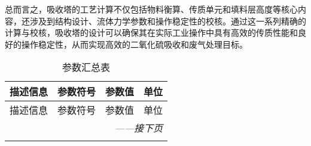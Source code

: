 总而言之，吸收塔的工艺计算不仅包括物料衡算、传质单元和填料层高度等核心内容，还涉及到结构设计、流体力学参数和操作稳定性的校核。通过这一系列精确的计算与校核，吸收塔的设计可以确保其在实际工业操作中具有高效的传质性能和良好的操作稳定性，从而实现高效的二氧化硫吸收和废气处理目标。

\clearpage

\begin{longtable}{
		@{} p{} p{} 
		p{} p{} @{}
		}
	\caption{参数汇总表} \\
	\toprule
	描述信息 & 参数符号 & 参数值 & 单位 \\
	\midrule
	\endfirsthead
	
	\toprule
	描述信息 & 参数符号 & 参数值 & 单位 \\
	\midrule
	\endhead
	
	\midrule
	\multicolumn{4}{r}{\textit{——接下页}} \\
	\endfoot
	
	\bottomrule
	\endlastfoot
	

\end{longtable}
